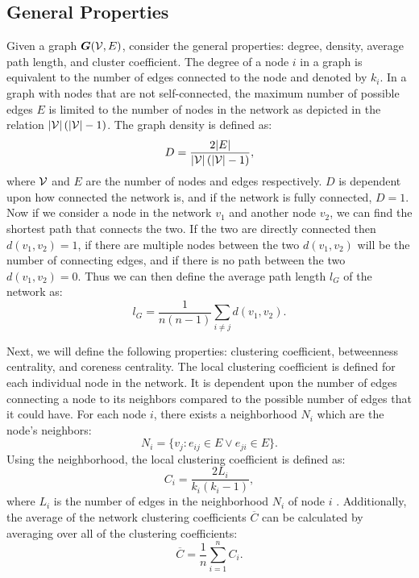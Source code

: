 \subsection{General Properties}\label{theory-gen-props}
Given a graph $\bm{G}(\mathcal{V},E)$, consider the general properties: degree, density, average path length, and cluster coefficient. The degree of a node $i$ in a graph is equivalent to the number of edges connected to the node and denoted by $k_i$. In a graph with nodes that are not self-connected, the maximum number of possible edges $E$ is limited to the number of nodes in the network as depicted in the relation $|\mathcal{V}|\left(|\mathcal{V}|-1\right)$. The graph density is defined as:
\begin{equation}\label{eq:density}
    D = \frac{2 |E|}{|\mathcal{V}|\left(|\mathcal{V}|-1\right)},
\end{equation}
where $\mathcal{V}$ and $E$ are the number of nodes and edges respectively. $D$ is dependent upon how connected the network is, and if the network is fully connected, $D = 1$. Now if we consider a node in the network $v_1$ and another node $v_2$, we can find the shortest path that connects the two. If the two are directly connected then $d\left(v_1, v_2\right) =1$, if there are multiple nodes between the two $d\left(v_1, v_2\right)$ will be the number of connecting edges, and if there is no path between the two $d\left(v_1, v_2\right)=0$. Thus we can then define the average path length $l_G$ of the network as:
\begin{equation}\label{eq:avg-path}
    l_G = \frac{1}{n\left(n-1 \right)}\sum_{i\neq j}d\left(v_1, v_2\right).
\end{equation}

Next, we will define the following properties: clustering coefficient, betweenness centrality, and coreness centrality. The local clustering coefficient is defined for each individual node in the network. It is dependent upon the number of edges connecting a node to its neighbors compared to the possible number of edges that it could have. For each node $i$, there exists a neighborhood $N_i$ which are the node's neighbors:
\begin{equation}\label{eq:n_i}
    N_i =    \{v_j : e_{ij} \in E \vee e_{ji} \in E \}.
\end{equation}
Using the neighborhood, the local clustering coefficient is defined as:
\begin{equation}\label{eq:C_i}
    C_i = \frac{2L_i}{k_i\left(k_i-1\right)},
\end{equation}
where $L_i$ is the number of edges in the neighborhood $N_i$ of node $i$ \citep{Watts1998,Barabasi2016}. Additionally, the average of the network clustering coefficients $\overline{C}$ can be calculated by averaging over all of the clustering coefficients:
\begin{equation}\label{eq:avg_ci}
    \overline{C} = \frac{1}{n}\sum_{i=1}^n C_i.
\end{equation}

